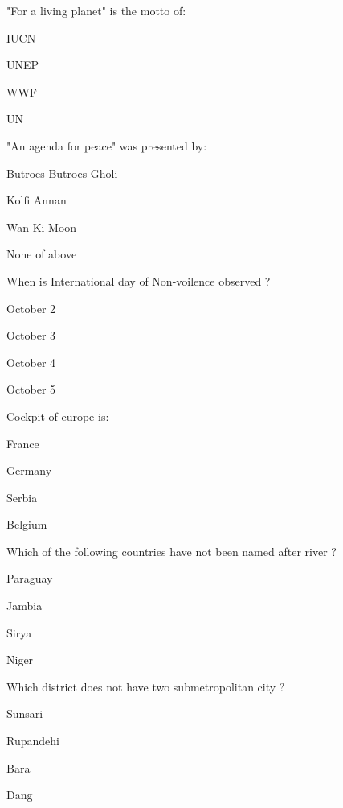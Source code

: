 \begin{questions}
\question "For a living planet" is the motto of:
  \begin{items}
  \item IUCN
  \item UNEP
  \item* WWF
  \item UN
  \end{items}

\question "An agenda for peace" was presented by:
  \begin{items}
  \item* Butroes Butroes Gholi
  \item Kolfi Annan
  \item Wan Ki Moon
  \item None of above
  \end{items}

\question When is International day of Non-voilence observed ?
  \begin{items}
  \item* October 2
  \item October 3
  \item October 4
  \item October 5
  \end{items}

\question Cockpit of europe is:
  \begin{items}
  \item France
  \item Germany
  \item Serbia
  \item* Belgium
  \end{items}

\question Which of the following countries have not been named after river ?
  \begin{items}
  \item Paraguay
  \item Jambia
  \item* Sirya
  \item Niger
  \end{items}

\question Which district does not have two submetropolitan city ?
  \begin{items}
  \item Sunsari
  \item* Rupandehi
  \item Bara
  \item Dang
  \end{items}


\end{questions}
